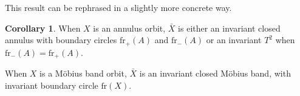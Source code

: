 \documentclass[10pt, oneside]{article}
\theoremstyle{definition}
\newtheorem{cor}{Corollary}[section]
\theoremstyle{definition}
\begin{document}
This result can be rephrased in a slightly more concrete way.

\begin{cor}
    When $X$ is an annulus orbit, $\bar{X}$ is either an invariant closed annulus with boundary circles $\text{fr}_+(A)$ and $\text{fr}_-(A)$ or an invariant $T^2$ when $\text{fr}_-(A) = \text{fr}_+(A)$.

    When $X$ is a M\"{o}bius band orbit, $\bar{X}$ is an invariant closed M\"{o}bius band, with invariant boundary circle $\text{fr}(X)$.
\end{cor}

\listoftodos[Notes]
\end{document}

